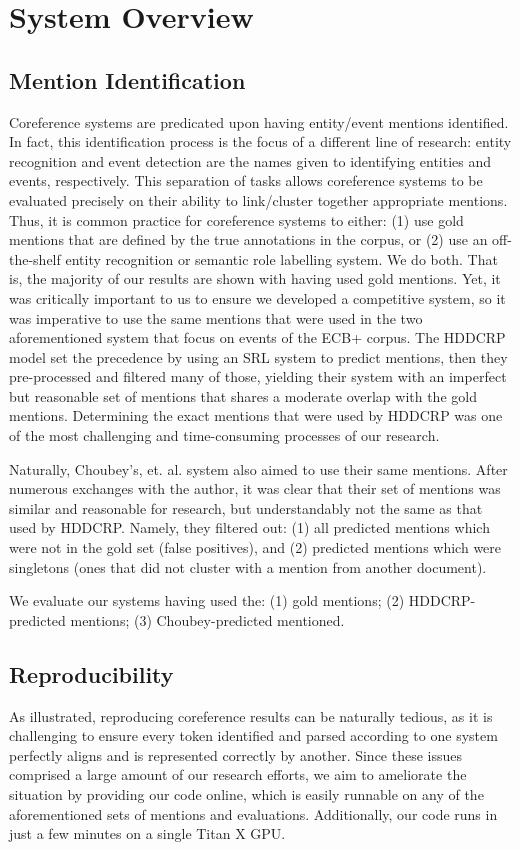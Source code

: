 \documentclass[11pt,a4paper]{article}
\begin{document}
\section{System Overview}
\subsection{Mention Identification}
Coreference systems are predicated upon having entity/event mentions identified.  In fact, this identification process is the focus of a different line of research: entity recognition and event detection are the names given to identifying entities and events, respectively.  This separation of tasks allows coreference systems to be evaluated precisely on their ability to link/cluster together appropriate mentions.  Thus, it is common practice for coreference systems to either: (1) use gold mentions that are defined by the true annotations in the corpus, or (2) use an off-the-shelf entity recognition or semantic role labelling system.  We do both.  That is, the majority of our results are shown with having used gold mentions.  Yet, it was critically important to us to ensure we developed a competitive system, so it was imperative to use the same mentions that were used in the two aforementioned system that focus on events of the ECB+ corpus.  The HDDCRP model set the precedence by using an SRL system to predict mentions, then they pre-processed and filtered many of those, yielding their system with an imperfect but reasonable set of mentions that shares a moderate overlap with the gold mentions.  Determining the exact mentions that were used by HDDCRP was one of the most challenging and time-consuming processes of our research.

Naturally, Choubey's, et. al. system also aimed to use their same mentions.  After numerous exchanges with the author, it was clear that their set of mentions was similar and reasonable for research, but understandably not the same as that used by HDDCRP.  Namely, they filtered out: (1) all predicted mentions which were not in the gold set (false positives), and (2) predicted mentions which were singletons (ones that did not cluster with a mention from another document).

We evaluate our systems having used the: (1) gold mentions; (2) HDDCRP-predicted mentions; (3) Choubey-predicted mentioned.

\subsection{Reproducibility}
As illustrated, reproducing coreference results can be naturally tedious, as it is challenging to ensure every token identified and parsed according to one system perfectly aligns and is represented correctly by another.  Since these issues comprised a large amount of our research efforts, we aim to ameliorate the situation by providing our code online, which is easily runnable on any of the aforementioned sets of mentions and evaluations.  Additionally, our code runs in just a few minutes on a single Titan X GPU.
\end{document}
